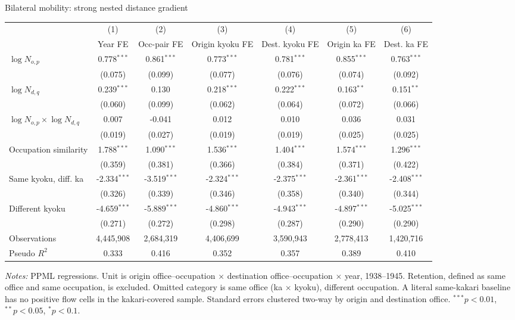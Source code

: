 \begin{frame}[t]{Bilateral mobility: strong nested distance gradient}
    \centering
    \tiny
    \setlength{\tabcolsep}{3.2pt}
    \begin{threeparttable}
    \begin{tabular}{lcccccc}
        \toprule
        & (1) & (2) & (3) & (4) & (5) & (6) \\
        & Year FE & Occ-pair FE & Origin kyoku FE & Dest. kyoku FE & Origin ka FE & Dest. ka FE \\
        \midrule
        $\log N_{o,p}$ & 0.778$^{***}$ & 0.861$^{***}$ & 0.773$^{***}$ & 0.781$^{***}$ & 0.855$^{***}$ & 0.763$^{***}$ \\
        & (0.075) & (0.099) & (0.077) & (0.076) & (0.074) & (0.092) \\
        $\log N_{d,q}$ & 0.239$^{***}$ & 0.130 & 0.218$^{***}$ & 0.222$^{***}$ & 0.163$^{**}$ & 0.151$^{**}$ \\
        & (0.060) & (0.099) & (0.062) & (0.064) & (0.072) & (0.066) \\
        $\log N_{o,p}\times \log N_{d,q}$ & 0.007 & -0.041 & 0.012 & 0.010 & 0.036 & 0.031 \\
        & (0.019) & (0.027) & (0.019) & (0.019) & (0.025) & (0.025) \\
        Occupation similarity & 1.788$^{***}$ & 1.090$^{***}$ & 1.536$^{***}$ & 1.404$^{***}$ & 1.574$^{***}$ & 1.296$^{***}$ \\
        & (0.359) & (0.381) & (0.366) & (0.384) & (0.371) & (0.422) \\
        Same kyoku, diff. ka & -2.334$^{***}$ & -3.519$^{***}$ & -2.324$^{***}$ & -2.375$^{***}$ & -2.361$^{***}$ & -2.408$^{***}$ \\
        & (0.326) & (0.339) & (0.346) & (0.358) & (0.340) & (0.344) \\
        Different kyoku & -4.659$^{***}$ & -5.889$^{***}$ & -4.860$^{***}$ & -4.943$^{***}$ & -4.897$^{***}$ & -5.025$^{***}$ \\
        & (0.271) & (0.272) & (0.298) & (0.287) & (0.290) & (0.290) \\
        \midrule
        Observations & 4,445,908 & 2,684,319 & 4,406,699 & 3,590,943 & 2,778,413 & 1,420,716 \\
        Pseudo $R^2$ & 0.333 & 0.416 & 0.352 & 0.357 & 0.389 & 0.410 \\
        \bottomrule
    \end{tabular}
    \begin{tablenotes}[flushleft]
        \tiny
        \item \textit{Notes:} PPML regressions. Unit is origin office--occupation $\times$ destination office--occupation $\times$ year, 1938--1945. Retention, defined as same office and same occupation, is excluded. Omitted category is same office (ka $\times$ kyoku), different occupation. A literal same-kakari baseline has no positive flow cells in the kakari-covered sample. Standard errors clustered two-way by origin and destination office. $^{***}p<0.01$, $^{**}p<0.05$, $^{*}p<0.1$.
    \end{tablenotes}
    \end{threeparttable}
\end{frame}

